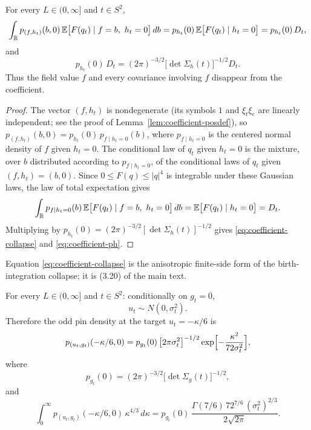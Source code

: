 \begin{lemma}\label{lem:coefficient-birth}
For every $L\in(0,\infty]$ and $t\in S^2$,
\begin{equation}\label{eq:coefficient-collapse}
\int_{\R}p_{(f,h_t)}(b,0)\,\E\bigl[F(q_t)\mid f=b,\ h_t=0\bigr]\,db=p_{h_t}(0)\,\E\bigl[F(q_t)\mid h_t=0\bigr]=p_{h_t}(0)\,D_t,
\end{equation}
and
\begin{equation}\label{eq:coefficient-ph}
p_{h_t}(0)\,D_t=(2\pi)^{-3/2}\bigl[\det\Sigma_h(t)\bigr]^{-1/2}D_t .
\end{equation}
Thus the field value $f$ and every covariance involving $f$ disappear from the coefficient.
\end{lemma}

\begin{proof}
The vector $(f,h_t)$ is nondegenerate (its symbols $1$ and $\xi_t\xi_e$ are linearly independent; see the proof of Lemma~\ref{lem:coefficient-posdef}), so $p_{(f,h_t)}(b,0)=p_{h_t}(0)\,p_{f\mid h_t=0}(b)$, where $p_{f\mid h_t=0}$ is the centered normal density of $f$ given $h_t=0$. The conditional law of $q_t$ given $h_t=0$ is the mixture, over $b$ distributed according to $p_{f\mid h_t=0}$, of the conditional laws of $q_t$ given $(f,h_t)=(b,0)$. Since $0\le F(q)\le|q|^4$ is integrable under these Gaussian laws, the law of total expectation gives
\[
\int_{\mathbb R}p_{f\mid h_t=0}(b)\,\mathbb E\bigl[F(q_t)\mid f=b,\ h_t=0\bigr]\,db=\mathbb E\bigl[F(q_t)\mid h_t=0\bigr]=D_t .
\]
Multiplying by $p_{h_t}(0)=(2\pi)^{-3/2}[\det\Sigma_h(t)]^{-1/2}$ gives \eqref{eq:coefficient-collapse} and \eqref{eq:coefficient-ph}.
\end{proof}

Equation \eqref{eq:coefficient-collapse} is the anisotropic finite-side form of the birth-integration collapse; it is (3.20) of the main text.

\begin{lemma}\label{lem:coefficient-gap}
For every $L\in(0,\infty]$ and $t\in S^2$: conditionally on $g_t=0$,
\begin{equation}\label{eq:coefficient-ucond}
u_t\sim N(0,\sigma_t^2).
\end{equation}
Therefore the odd pin density at the target $u_t=-\kappa/6$ is
\begin{equation}\label{eq:coefficient-podd}
p_{(u_t,g_t)}(-\kappa/6,0)=p_{g_t}(0)\,\bigl[2\pi\sigma_t^2\bigr]^{-1/2}\exp\Bigl[-\frac{\kappa^2}{72\sigma_t^2}\Bigr],
\end{equation}
where
\begin{equation}\label{eq:coefficient-pg}
p_{g_t}(0)=(2\pi)^{-3/2}\bigl[\det\Sigma_g(t)\bigr]^{-1/2},
\end{equation}
and
\begin{equation}\label{eq:coefficient-gap}
\int_0^\infty p_{(u_t,g_t)}(-\kappa/6,0)\,\kappa^{4/3}\,d\kappa=p_{g_t}(0)\,\frac{\Gamma(7/6)\,72^{7/6}\,(\sigma_t^2)^{2/3}}{2\sqrt{2\pi}} .
\end{equation}
\end{lemma}

